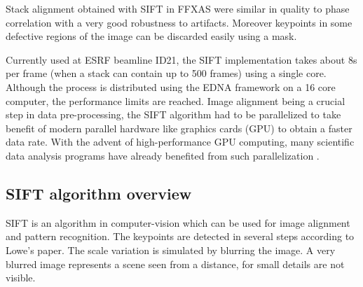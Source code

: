 \documentclass[preprint]{iucr}
\begin{document}
Stack alignment obtained with SIFT in FFXAS were similar in quality to phase
correlation with a very good robustness to artifacts.
Moreover keypoints in some defective regions of the image can be
discarded easily using a mask.

Currently used at ESRF beamline ID21, the SIFT implementation takes about 8s
per frame (when a stack can contain up to  500 frames) using a single core.
Although the process is distributed using the EDNA\cite{edna} framework on a 16
core computer, the performance limits are reached.
Image alignment being a crucial step in data pre-processing, the SIFT
algorithm had to be parallelized to take benefit of modern parallel
hardware like graphics cards (GPU) to obtain a faster data rate.
With the advent of high-performance GPU computing, many scientific data analysis
programs have already benefited from such parallelization
\cite{pyhst,pyfai,Favre-Nicolin}.

\subsection{SIFT algorithm overview}
SIFT is an algorithm in computer-vision which can be used for image alignment and pattern recognition. The keypoints are detected in several steps according to Lowe's paper\cite{Lowe99}.
The scale variation is simulated by blurring the image. A very blurred image represents a scene seen from a distance, for small details are not visible.
\end{document}
